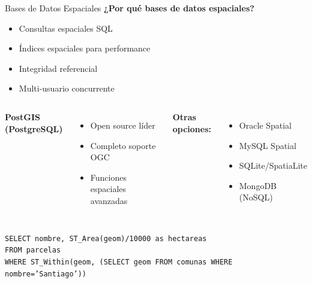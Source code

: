 \documentclass[10pt]{beamer}
\begin{document}
\begin{frame}{Bases de Datos Espaciales}
    \textbf{¿Por qué bases de datos espaciales?}
    \begin{itemize}
        \item Consultas espaciales SQL
        \item Índices espaciales para performance
        \item Integridad referencial
        \item Multi-usuario concurrente
    \end{itemize}
    
    \vspace{0.3cm}
    \begin{columns}
        \textbf{PostGIS (PostgreSQL)}
        \begin{itemize}
            \item Open source líder
            \item Completo soporte OGC
            \item Funciones espaciales avanzadas
        \end{itemize}
        
        \textbf{Otras opciones:}
        \begin{itemize}
            \item Oracle Spatial
            \item MySQL Spatial
            \item SQLite/SpatiaLite
            \item MongoDB (NoSQL)
        \end{itemize}
    \end{columns}
    
    \vspace{0.3cm}
    \begin{tcolorbox}[colframe=blue!50]
        \small
        \texttt{SELECT nombre, ST\_Area(geom)/10000 as hectareas\\
        FROM parcelas\\
        WHERE ST\_Within(geom, (SELECT geom FROM comunas WHERE nombre='Santiago'))}
    \end{tcolorbox}
\end{frame}
\end{document}
